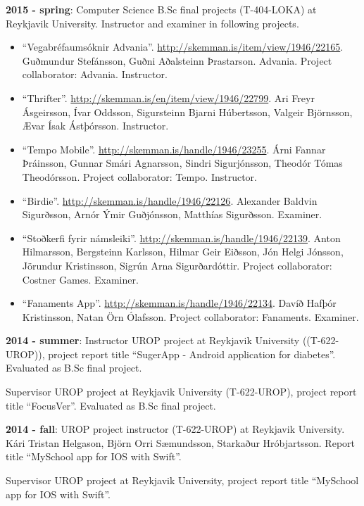 \textbf{2015 - spring}: Computer Science B.Sc final projects (T-404-LOKA) at Reykjavik University. Instructor and examiner in following projects.

\begin{itemize}
\item ``Vegabréfaumsóknir Advania''. \url{http://skemman.is/item/view/1946/22165}. Guðmundur Stefánsson, Guðni Aðalsteinn Þrastarson. Advania. Project collaborator: Advania. Instructor.

\item ``Thrifter''. \url {http://skemman.is/en/item/view/1946/22799}. Ari Freyr Ásgeirsson, Ívar Oddsson, Sigursteinn Bjarni Húbertsson, Valgeir Björnsson, Ævar Ísak Ástþórsson. Instructor.

\item ``Tempo Mobile''. \url{http://skemman.is/handle/1946/23255}. Árni Fannar Þráinsson, Gunnar Smári Agnarsson, Sindri Sigurjónsson, Theodór Tómas Theodórsson. Project collaborator: Tempo. Instructor.

\item ``Birdie''. \url{http://skemman.is/handle/1946/22126}. Alexander Baldvin Sigurðsson, Arnór Ýmir Guðjónsson, Matthías Sigurðsson. Examiner.

\item ``Stoðkerfi fyrir námsleiki''. \url{http://skemman.is/handle/1946/22139}. Anton Hilmarsson, Bergsteinn Karlsson, Hilmar Geir Eiðsson, Jón Helgi Jónsson, Jörundur Kristinsson, Sigrún Arna Sigurðardóttir. Project collaborator: Costner Games. Examiner.

\item ``Fanaments App''. \url{http://skemman.is/handle/1946/22134}. Davíð Hafþór Kristinsson, Natan Örn Ólafsson. Project collaborator: Fanaments. Examiner.
\end{itemize}

\textbf{2014 - summer}: %
Instructor UROP project at Reykjavik University ((T-622-UROP)), project report title
``SugerApp - Android application for diabetes''. Evaluated as B.Sc final
project.

Supervisor UROP project at Reykjavik University (T-622-UROP), project report title
``FocusVer''. Evaluated as B.Sc final project.

\textbf{2014 - fall}: UROP project instructor (T-622-UROP) at Reykjavik University. Kári Tristan Helgason, Björn Orri Sæmundsson, Starkaður Hróbjartsson. Report title ``MySchool app for IOS with Swift''.

Supervisor UROP project at Reykjavik University, project report title ``MySchool app for IOS with Swift''.

